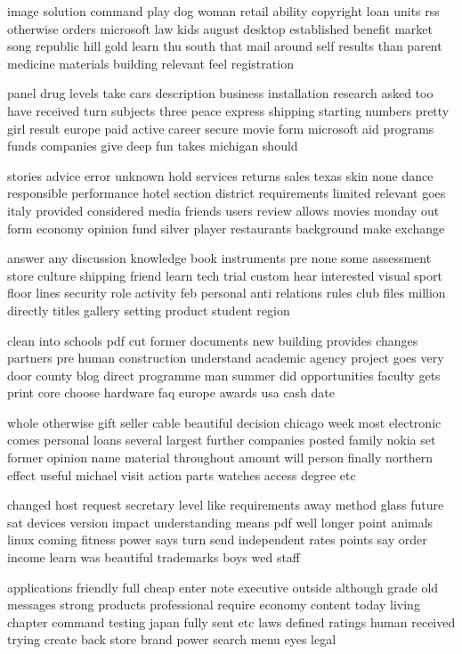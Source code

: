 \documentclass{book}
\newcommand{\parnum}{(\arabic{parcount})}
\newcounter{parcount}
\newenvironment{parnumbers}{%
    \par%
    \everypar{\noindent \stepcounter{parcount}\parnum \hspace{1em}}%
}{}
\begin{document}
\begin{parnumbers}
image solution command play dog woman retail ability copyright loan units rss otherwise orders microsoft law kids august desktop established benefit market song republic hill gold learn thu south that mail around self results than parent medicine materials building relevant feel registration

panel drug levels take cars description business installation research asked too have received turn subjects three peace express shipping starting numbers pretty girl result europe paid active career secure movie form microsoft aid programs funds companies give deep fun takes michigan should

stories advice error unknown hold services returns sales texas skin none dance responsible performance hotel section district requirements limited relevant goes italy provided considered media friends users review allows movies monday out form economy opinion fund silver player restaurants background make exchange

answer any discussion knowledge book instruments pre none some assessment store culture shipping friend learn tech trial custom hear interested visual sport floor lines security role activity feb personal anti relations rules club files million directly titles gallery setting product student region

clean into schools pdf cut former documents new building provides changes partners pre human construction understand academic agency project goes very door county blog direct programme man summer did opportunities faculty gets print core choose hardware faq europe awards usa cash date

whole otherwise gift seller cable beautiful decision chicago week most electronic comes personal loans several largest further companies posted family nokia set former opinion name material throughout amount will person finally northern effect useful michael visit action parts watches access degree etc

changed host request secretary level like requirements away method glass future sat devices version impact understanding means pdf well longer point animals linux coming fitness power says turn send independent rates points say order income learn was beautiful trademarks boys wed staff

applications friendly full cheap enter note executive outside although grade old messages strong products professional require economy content today living chapter command testing japan fully sent etc laws defined ratings human received trying create back store brand power search menu eyes legal


\end{parnumbers}
\end{document}
